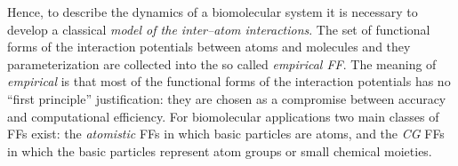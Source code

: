 
Hence, to describe the dynamics of a biomolecular system it is necessary to develop a classical \textit{model of the inter--atom interactions}. The set of functional forms of the interaction potentials between atoms and molecules and they parameterization are collected into the so called \textit{empirical \acf{FF}}. The meaning of \textit{empirical} is that most of the functional forms of the interaction potentials has no ``first principle'' justification: they are chosen as a compromise between accuracy and computational efficiency. For biomolecular applications two main classes of \acp{FF} exist: the \textit{atomistic} \acp{FF} in which basic
particles are atoms, and the \textit{\ac{CG}} \acp{FF} in which the basic particles represent atom groups or
small chemical moieties.


